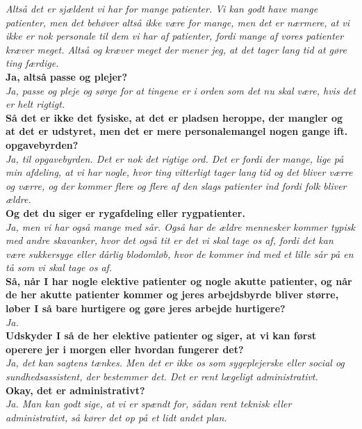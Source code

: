 \noindent
\textit{Altså det er sjældent vi har for mange patienter. Vi kan godt have mange patienter, men det behøver altså ikke være for mange, men det er nærmere, at vi ikke er nok personale til dem vi har af patienter, fordi mange af vores patienter kræver meget. Altså og kræver meget der mener jeg, at det tager lang tid at gøre ting færdige.}\\ 
\noindent
\textbf{Ja, altså passe og plejer?}\\
\noindent
\textit{Ja, passe og pleje og sørge for at tingene er i orden som det nu skal være, hvis det er helt rigtigt.}\\
\noindent
\textbf{Så det er ikke det fysiske, at det er pladsen heroppe, der mangler og at det er udstyret, men det er mere personalemangel nogen gange ift. opgavebyrden?}\\
\noindent
\textit{Ja, til opgavebyrden. Det er nok det rigtige ord. Det er fordi der mange, lige på min afdeling, at vi har nogle, hvor ting vitterligt tager lang tid og det bliver værre og værre, og der kommer flere og flere af den slags patienter ind fordi folk bliver ældre.}\\
\noindent
\textbf{Og det du siger er rygafdeling eller rygpatienter.}\\
\noindent
\textit{Ja, men vi har også mange med sår. Også har de ældre mennesker kommer typisk med andre skavanker, hvor det også tit er det vi skal tage os af, fordi det kan være sukkersyge eller dårlig blodomløb, hvor de kommer ind med et lille sår på en tå som vi skal tage os af.}\\
\noindent
\textbf{Så, når I har nogle elektive patienter og nogle akutte patienter, og når de her akutte patienter kommer og jeres arbejdsbyrde bliver større, løber I så bare hurtigere og gøre jeres arbejde hurtigere?}\\
\noindent
\textit{Ja.}\\
\noindent
\textbf{Udskyder I så de her elektive patienter og siger, at vi kan først operere jer i morgen eller hvordan fungerer det?}\\
\noindent
\textit{Ja, det kan sagtens tænkes. Men det er ikke os som sygeplejerske eller social og sundhedsassistent, der bestemmer det. Det er rent lægeligt administrativt.}\\
\noindent
\textbf{Okay, det er administrativt?}\\
\noindent
\textit{Ja. Man kan godt sige, at vi er spændt for, sådan rent teknisk eller administrativt, så kører det op på et lidt andet plan.}\\

